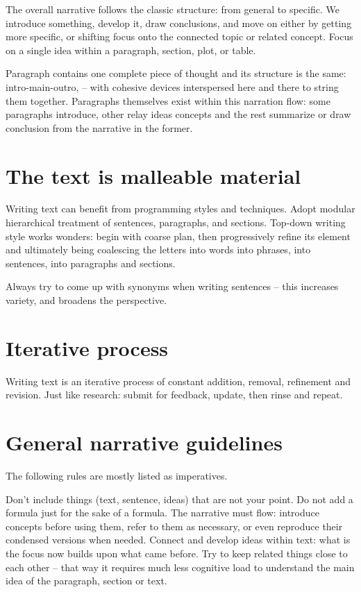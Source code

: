 \documentclass[10pt,a4paper,twocolumn]{article}
\begin{document}
The overall narrative follows the classic structure: from general to specific. We introduce
something, develop it, draw conclusions, and move on either by getting more specific, or
shifting focus onto the connected topic or related concept. Focus on a single idea within a
paragraph, section, plot, or table.

Paragraph contains one complete piece of thought and its structure is the same: intro-main-outro,
-- with cohesive devices interspersed here and there to string them together. Paragraphs
themselves exist within this narration flow: some paragraphs introduce, other relay ideas
concepts and the rest summarize or draw conclusion from the narrative in the former.


\section{The text is malleable material} %
\label{sec:the_text_is_malleable_material}

Writing text can benefit from programming styles and techniques. Adopt modular hierarchical
treatment of sentences, paragraphs, and sections. Top-down writing style works wonders: begin
with coarse plan, then progressively refine its element and ultimately being coalescing the
letters into words into phrases, into sentences, into paragraphs and sections.

Always try to come up with synonyms when writing sentences -- this increases variety, and
broadens the perspective.


\section{Iterative process} %
\label{sec:iterative_process}

Writing text is an iterative process of constant addition, removal, refinement and revision.
Just like research: submit for feedback, update, then rinse and repeat.

\section{General narrative guidelines} %
\label{sec:general_narrative_guidelines}

The following rules are mostly listed as imperatives.

Don't include things (text, sentence, ideas) that are not your point. Do not add a formula
just for the sake of a formula. The narrative must flow: introduce concepts before using them,
refer to them as necessary, or even reproduce their condensed versions when needed. Connect
and develop ideas within text: what is the focus now builds upon what came before. Try to keep
related things close to each other -- that way it requires much less cognitive load to understand
the main idea of the paragraph, section or text.

\end{document}
